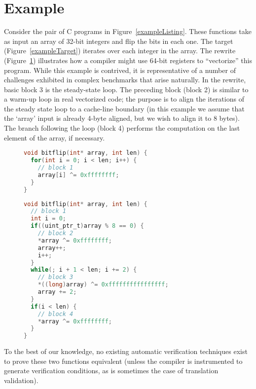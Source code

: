 \section{Example}\label{example-sec}

Consider the pair of C programs in Figure~\ref{exampleListing}. These
functions take as input an array of 32-bit integers and flip the bits
in each one. The target (Figure~\ref{exampleTarget}) iterates over
each integer in the array. The rewrite (Figure~\ref{exampleRewrite})
illustrates how a compiler might use 64-bit registers to ``vectorize''
this program. While this example is contrived, it is representative
of a number of challenges exhibited in complex benchmarks that arise
naturally. In the rewrite, basic block 3 is the steady-state loop.
The preceding block (block 2) is similar to a warm-up loop in real
vectorized code; the purpose is to align the iterations of the steady
state loop to a cache-line boundary (in this example we assume that the `array'
input is already 4-byte aligned, but we wish to align it to 8 bytes). The
branch following the loop (block 4) performs the computation on the
last element of the array, if necessary.

\begin{figure}
\label{exampleListing}
\begin{lstlisting}[language=C]
void bitflip(int* array, int len) {
  for(int i = 0; i < len; i++) {
    // block 1
    array[i] ^= 0xffffffff;
  }
}
\end{lstlisting}
\label{exampleTarget}
\begin{lstlisting}[language=C]
void bitflip(int* array, int len) {
  // block 1
  int i = 0;
  if((uint_ptr_t)array % 8 == 0) {
    // block 2
    *array ^= 0xffffffff;
    array++;
    i++;
  } 
  while(; i + 1 < len; i += 2) {
    // block 3
    *((long)array) ^= 0xffffffffffffffff;
    array += 2;
  }
  if(i < len) {
    // block 4
    *array ^= 0xffffffff;
  }
}
\end{lstlisting}
\label{exampleRewrite}
\end{figure}

To the best of our knowledge, no existing automatic verification
techniques exist to prove these two functions equivalent (unless the
compiler is instrumented to generate verification conditions, as is
sometimes the case of translation validation).

